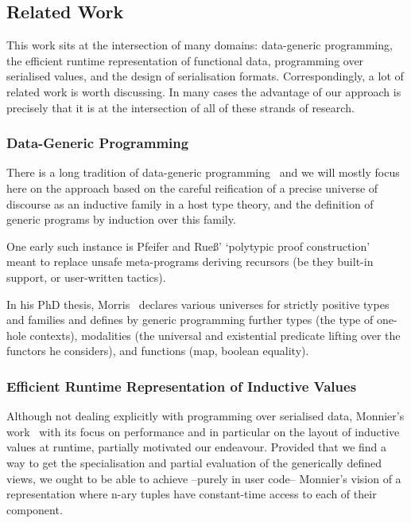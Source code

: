\subsection{Related Work}

This work sits at the intersection of many domains:
data-generic programming,
the efficient runtime representation of functional data,
programming over serialised values,
and the design of serialisation formats.
%
Correspondingly, a lot of related work is worth discussing.
In many cases the advantage of our approach is precisely that it is
at the intersection of all of these strands of research.

\subsubsection{Data-Generic Programming}

There is a long tradition of data-generic
programming~\cite{DBLP:conf/ssdgp/Gibbons06} and we will mostly focus here
on the approach based on the careful reification of a precise universe of
discourse as an inductive family in a host type theory,
and the definition of generic programs by induction over this family.

One early such instance is Pfeifer and Rue{\ss}'
`polytypic proof construction'~\cite{DBLP:conf/tphol/PfeiferR99}
meant to replace unsafe meta-programs deriving recursors
(be they built-in support, or user-written tactics).


In his PhD thesis, Morris~\cite{DBLP:phd/ethos/Morris07} declares various
universes for strictly positive types and families and defines by generic
programming
further types (the type of one-hole contexts),
modalities (the universal and existential predicate lifting over the functors he considers),
and functions (map, boolean equality).



\subsubsection{Efficient Runtime Representation of Inductive Values}

Although not dealing explicitly with programming over serialised data,
Monnier's work~\cite{DBLP:conf/icfp/Monnier19} with its focus on performance and
in particular on the layout of inductive values at runtime,
partially motivated our endeavour.
%
Provided that we find a way to get the specialisation and partial evaluation
of the generically defined views, we ought to be able to achieve --purely in
user code-- Monnier's vision of a representation where n-ary tuples have
constant-time access to each of their component.

